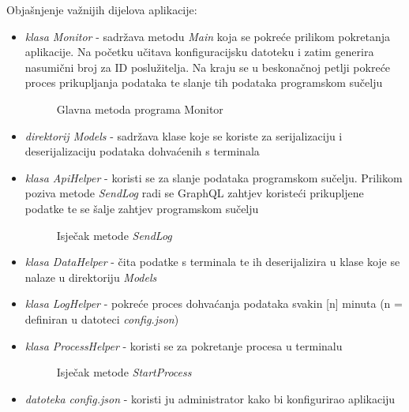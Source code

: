 \documentclass[zavrsnirad]{fer}
\begin{document}
Objašnjenje važnijih dijelova aplikacije:
\begin{itemize}
	\item \textit{klasa Monitor} - sadržava metodu \textit{Main} koja se pokreće prilikom pokretanja aplikacije. Na početku učitava konfiguracijsku datoteku i zatim generira nasumični broj za ID poslužitelja. Na kraju se u beskonačnoj petlji pokreće proces prikupljanja podataka te slanje tih podataka programskom sučelju
	\begin{figure}[htb]
		\centering
		
		\caption{Glavna metoda programa Monitor}
	\end{figure}
	\FloatBarrier	
	\item \textit{direktorij Models} - sadržava klase koje se koriste za serijalizaciju i deserijalizaciju podataka dohvaćenih s terminala
	\item \textit{klasa ApiHelper} - koristi se za slanje podataka programskom sučelju. Prilikom poziva metode \textit{SendLog} radi se GraphQL zahtjev koristeći prikupljene podatke te se šalje zahtjev programskom sučelju
	\begin{figure}[htb]
		\centering
		
		\caption{Isječak metode \textit{SendLog}}
	\end{figure}
	\FloatBarrier		
	\item \textit{klasa DataHelper} - čita podatke s terminala te ih deserijalizira u klase koje se nalaze u direktoriju \textit{Models}
	\item \textit{klasa LogHelper} - pokreće proces dohvaćanja podataka svakin [n] minuta (n = definiran u datoteci \textit{config.json})
	\item \textit{klasa ProcessHelper} - koristi se za pokretanje procesa u terminalu
	\begin{figure}[htb]
		\centering
		
		\caption{Isječak metode \textit{StartProcess}}
	\end{figure}	
	\item \textit{datoteka config.json} - koristi ju administrator kako bi konfigurirao aplikaciju
\end{itemize}
\end{document}
